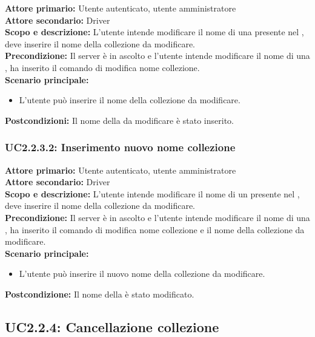 \documentclass{scalatekids-article}
\begin{document}
\textbf{Attore primario:} Utente autenticato, utente amministratore\\
\textbf{Attore secondario:} Driver\\
\textbf{Scopo e descrizione:} L'utente intende modificare il nome di una  presente nel , deve inserire il nome della collezione da modificare.\\
\textbf{Precondizione:} Il server è in ascolto e l'utente intende modificare il nome di una , ha inserito il comando di modifica nome collezione.\\
\textbf{Scenario principale:}
\begin{itemize}
\item L'utente può inserire il nome della collezione da modificare.
\end{itemize}
\textbf{Postcondizioni:} Il nome della  da modificare è stato inserito.

\subsubsection{UC2.2.3.2: Inserimento nuovo nome collezione}

\textbf{Attore primario:} Utente autenticato, utente amministratore\\
\textbf{Attore secondario:} Driver\\
\textbf{Scopo e descrizione:} L'utente intende modificare il nome di un  presente nel , deve inserire il nome della collezione da modificare.\\
\textbf{Precondizione:} Il server è in ascolto e l'utente intende modificare il nome di una , ha inserito il comando di modifica nome collezione e il nome della collezione da modificare.\\
\textbf{Scenario principale:}
\begin{itemize}
\item L'utente può inserire il nuovo nome della collezione da modificare.
\end{itemize}
\textbf{Postcondizione:} Il nome della  è stato modificato.

\subsection{UC2.2.4: Cancellazione collezione}
\end{document}

